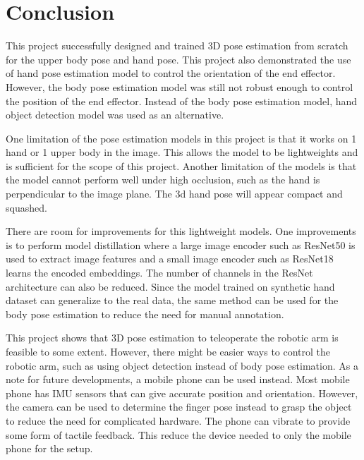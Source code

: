 \section{Conclusion}
\noindent
This project successfully designed and trained 3D pose estimation from scratch for the upper body pose and hand pose. This project also demonstrated the use of hand pose estimation model to control the orientation of the end effector. However, the body pose estimation model was still not robust enough to control the position of the end effector. Instead of the body pose estimation model, hand object detection model was used as an alternative.

\noindent
One limitation of the pose estimation models in this project is that it works on 1 hand or 1 upper body in the image. This allows the model to be lightweights and is sufficient for the scope of this project. Another limitation of the models is that the model cannot perform well under high occlusion, such as the hand is perpendicular to the image plane. The 3d hand pose will appear compact and squashed.

\noindent
There are room for improvements for this lightweight models. One improvements is to perform model distillation where a large image encoder such as ResNet50 is used to extract image features and a small image encoder such as ResNet18 learns the encoded embeddings. The number of channels in the ResNet architecture can also be reduced. Since the model trained on synthetic hand dataset can generalize to the real data, the same method can be used for the body pose estimation to reduce the need for manual annotation.

\noindent
This project shows that 3D pose estimation to teleoperate the robotic arm is feasible to some extent. However, there might be easier ways to control the robotic arm, such as using object detection instead of body pose estimation. As a note for future developments, a mobile phone can be used instead. Most mobile phone has IMU sensors that can give accurate position and orientation. However, the camera can be used to determine the finger pose instead to grasp the object to reduce the need for complicated hardware. The phone can vibrate to provide some form of tactile feedback. This reduce the device needed to only the mobile phone for the setup.
